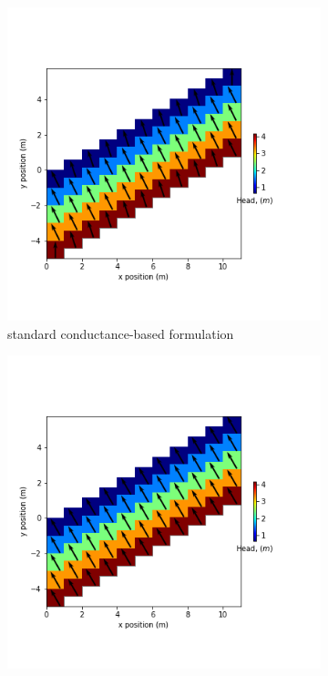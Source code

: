 \documentclass{article}
\begin{document}
\begin{figure}[H]
\centering
\begin{subfigure}{0.4\textwidth}
	\includegraphics[width=\textwidth]{../figures/disu-s-cc-cf-head.png}
	\caption{standard conductance-based formulation}
	\label{fig:disu-s-cc-cf-head}
\end{subfigure}
\hfill
\begin{subfigure}{0.4\textwidth}
	\includegraphics[width=\textwidth]{../figures/disu-x-cc-cf-head.png}

\end{subfigure}
\end{figure}
\end{document}
